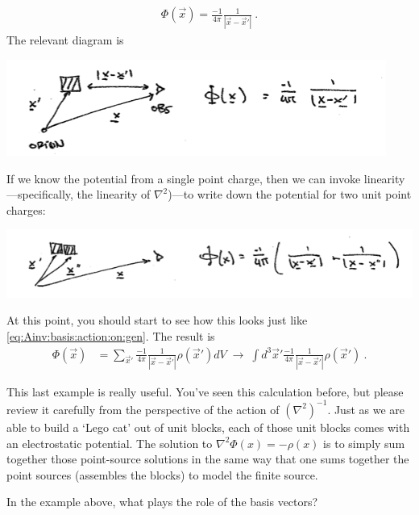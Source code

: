 \begin{example}
\begin{align}
  \Phi(\vec{x}) = \frac{-1}{4\pi} \frac{1}{|\vec{x}-\vec{x}'|} \ .
\end{align}
The relevant diagram is
\begin{center}
\includegraphics[width=.6\textwidth]{figures/lec06_1charge.png}
\end{center}
If we know the potential from a single point charge, then we can invoke linearity---specifically, the linearity of $\nabla^2$)---to write down the potential for two unit point charges: 
\begin{center}
\includegraphics[width=.7\textwidth]{figures/lec06_2charge.png}
\end{center}
At this point, you should start to see how this looks just like \eqref{eq:Ainv:basis:action:on:gen}. The result is
\begin{align}
  \Phi(\vec{x}) &= 
  \sum_{\vec{x}'} \frac{-1}{4\pi} \frac{1}{|\vec{x}-\vec{x}'|} \rho(\vec{x}') dV
  \;\to \;
 \int d^3\vec{x}' \frac{-1}{4\pi} \frac{1}{|\vec{x}-\vec{x}'|} \rho(\vec{x}')   \ .
 \label{eq:electrostatics:greens:func}
\end{align}
\end{example}
This last example is really useful. You've seen this calculation before, but please review it carefully from the perspective of the action of $(\nabla^2)^{-1}$. Just as we are able to build a `Lego cat' out of unit blocks, each of those unit blocks comes with an electrostatic potential. The solution to $\nabla^2 \Phi(x) = -\rho(x)$ is to simply sum together those point-source solutions in the same way that one sums together the point sources (assembles the blocks) to model the finite source.

\begin{exercise}
In the example above, what plays the role of the basis vectors? 
\end{exercise}


